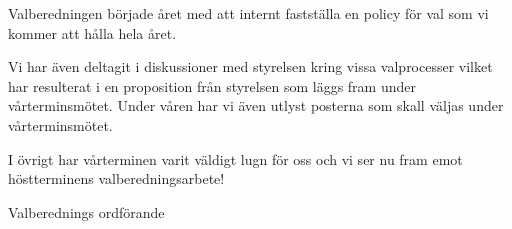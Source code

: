 \documentclass[../_main/handlingar.tex]{subfiles}
\begin{document}
Valberedningen började året med att internt fastställa en policy för val som vi kommer att hålla hela året.

Vi har även deltagit i diskussioner med styrelsen kring vissa valprocesser vilket har resulterat i en proposition från styrelsen som läggs fram under vårterminsmötet. Under våren har vi även utlyst posterna som skall väljas under vårterminsmötet.

I övrigt har vårterminen varit väldigt lugn för oss och vi ser nu fram emot höstterminens valberedningsarbete!

\begin{signatures}{1}
    \mvh
    \signature{Christian Benson}{Valberednings ordförande}
\end{signatures}
\end{document}

